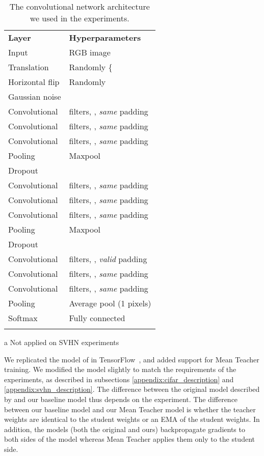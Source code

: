 \documentclass{article}
\begin{document}
\begin{table}[t]
\centering
\begin{threeparttable}[t]
\caption{\label{tbl:architecture}
The convolutional network architecture we used in the experiments.
}
\vspace*{\baselineskip}
\begin{tabular}{ l l }
\noalign{\medskip}
\bf{Layer} & \bf{Hyperparameters} \\
\Xhline{1pt}\noalign{\smallskip}
Input  &  RGB image \\
Translation & Randomly \{ \\
Horizontal flip\tnote{a} & Randomly  \\
Gaussian noise &  \\
Convolutional &  filters, , \textit{same} padding \\
Convolutional &  filters, , \textit{same} padding \\
Convolutional &  filters, , \textit{same} padding \\
Pooling   & Maxpool  \\
Dropout   &  \\
Convolutional &  filters, , \textit{same} padding \\
Convolutional &  filters, , \textit{same} padding \\
Convolutional &  filters, , \textit{same} padding \\
Pooling & Maxpool  \\
Dropout &  \\
Convolutional &  filters, , \textit{valid} padding \\
Convolutional &  filters, , \textit{same} padding \\
Convolutional &  filters, , \textit{same} padding \\
Pooling & Average pool (1 pixels) \\
Softmax & Fully connected  \\
\Xhline{1pt}\noalign{\smallskip}
\end{tabular}
\begin{tablenotes}
\item [a] Not applied on SVHN experiments
\end{tablenotes}
\end{threeparttable}
\end{table}

We replicated the  model of \citet{laine_temporal_2016} in TensorFlow~\citep{abadi_tensorflow:_2015}, and added support for Mean Teacher training.
We modified the model slightly to match the requirements of the experiments, as described in subsections \ref{appendix:cifar_description} and \ref{appendix:svhn_description}.
The difference between the original  model described by \citet{laine_temporal_2016} and our baseline  model thus depends on the experiment.
The difference between our baseline  model and our Mean Teacher model is whether the teacher weights are identical to the student weights or an EMA of the student weights.
In addition, the  models (both the original and ours) backpropagate gradients to both sides of the model whereas Mean Teacher applies them only to the student side.
\end{document}
